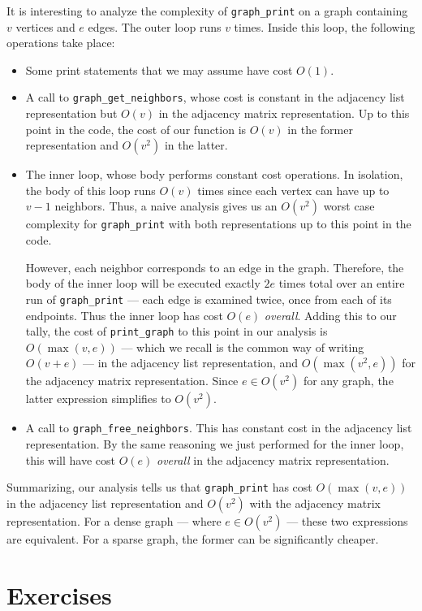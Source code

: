 It is interesting to analyze the complexity of \lstinline'graph_print'
on a graph containing $v$ vertices and $e$ edges.  The outer loop runs
$v$ times.  Inside this loop, the following operations take place:
\begin{itemize}
\item%
  Some print statements that we may assume have cost $O(1)$.
\item%
  A call to \lstinline'graph_get_neighbors', whose cost is constant in
  the adjacency list representation but $O(v)$ in the adjacency matrix
  representation.  Up to this point in the code, the cost of our
  function is $O(v)$ in the former representation and $O(v^2)$ in the
  latter.
\item%
  The inner loop, whose body performs constant cost operations.  In
  isolation, the body of this loop runs $O(v)$ times since each vertex
  can have up to $v-1$ neighbors.  Thus, a naive analysis gives us an
  $O(v^2)$ worst case complexity for \lstinline'graph_print' with both
  representations up to this point in the code.

  However, each neighbor corresponds to an edge in the graph.
  Therefore, the body of the inner loop will be executed exactly $2e$
  times total over an entire run of \lstinline'graph_print' --- each
  edge is examined twice, once from each of its endpoints.  Thus the
  inner loop has cost $O(e)$ \emph{overall}.  Adding this to our
  tally, the cost of \lstinline'print_graph' to this point in our
  analysis is $O(\max(v,e))$ --- which we recall is the common way of
  writing $O(v+e)$ --- in the adjacency list representation, and
  $O(\max(v^2, e))$ for the adjacency matrix representation.  Since $e
  \in O(v^2)$ for any graph, the latter expression simplifies to
  $O(v^2)$.

\item%
  A call to \lstinline'graph_free_neighbors'.  This has constant cost
  in the adjacency list representation.  By the same reasoning we just
  performed for the inner loop, this will have cost $O(e)$
  \emph{overall} in the adjacency matrix representation.
\end{itemize}
Summarizing, our analysis tells us that \lstinline'graph_print' has
cost $O(\max(v,e))$ in the adjacency list representation and $O(v^2)$
with the adjacency matrix representation.  For a dense graph --- where $e
\in O(v^2)$ --- these two expressions are equivalent.  For a sparse
graph, the former can be significantly cheaper.


\clearpage
\section{Exercises}
\label{sec:graphs:exercises}

